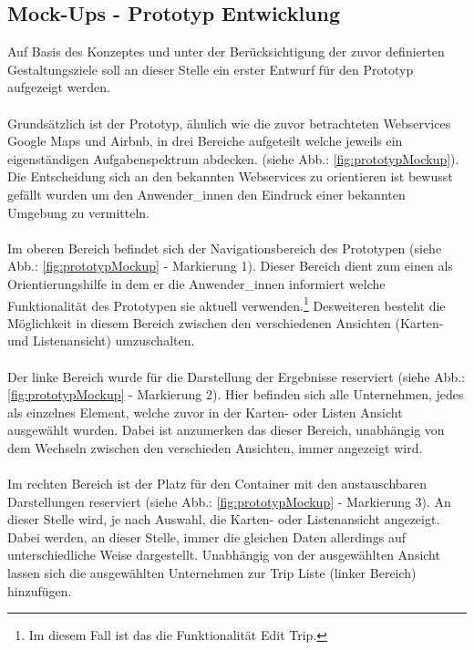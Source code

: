 \documentclass[Bachelorarbeit.tex]{subfiles}
\begin{document}
\subsection{Mock-Ups - Prototyp Entwicklung}
\label{chap:entwicklung:sec:design_entwurf:sub:mockUps}
Auf Basis des Konzeptes und unter der Berücksichtigung der zuvor definierten Gestaltungsziele soll an dieser Stelle ein erster Entwurf für den Prototyp aufgezeigt werden.\\
\\
Grundsätzlich ist der Prototyp, ähnlich wie die zuvor betrachteten Webservices Google Maps und Airbnb, in drei Bereiche aufgeteilt welche jeweils ein eigenständigen Aufgabenspektrum abdecken. (siehe Abb.: \ref{fig:prototypMockup}). 
Die Entscheidung sich an den bekannten Webservices zu orientieren ist bewusst gefällt wurden um den Anwender\_innen den Eindruck einer bekannten Umgebung zu vermitteln.\\
\\
Im oberen Bereich befindet sich der Navigationsbereich des Prototypen (siehe Abb.: \ref{fig:prototypMockup} - Markierung 1). 
Dieser Bereich dient zum einen als Orientierungshilfe in dem er die Anwender\_innen informiert welche Funktionalität des Prototypen sie aktuell verwenden.\footnote{Im diesem Fall ist das die Funktionalität Edit Trip.}
Desweiteren besteht die Möglichkeit in diesem Bereich zwischen den verschiedenen Ansichten (Karten- und Listenansicht) umzuschalten.\\
\\
Der linke Bereich wurde für die Darstellung der Ergebnisse reserviert (siehe Abb.: \ref{fig:prototypMockup} - Markierung 2). 
Hier befinden sich alle Unternehmen, jedes als einzelnes Element, welche zuvor in der Karten- oder Listen Ansicht ausgewählt wurden.
Dabei ist anzumerken das dieser Bereich, unabhängig von dem Wechseln zwischen den verschieden Ansichten, immer angezeigt wird. \\
\\
Im rechten Bereich ist der Platz für den Container mit den austauschbaren Darstellungen reserviert (siehe Abb.: \ref{fig:prototypMockup} - Markierung 3). 
An dieser Stelle wird, je nach Auswahl, die Karten- oder Listenansicht angezeigt.
Dabei werden, an dieser Stelle, immer die gleichen Daten allerdings auf unterschiedliche Weise dargestellt.
Unabhängig von der ausgewählten Ansicht lassen sich die ausgewählten Unternehmen zur Trip Liste (linker Bereich) hinzufügen.
\end{document}

